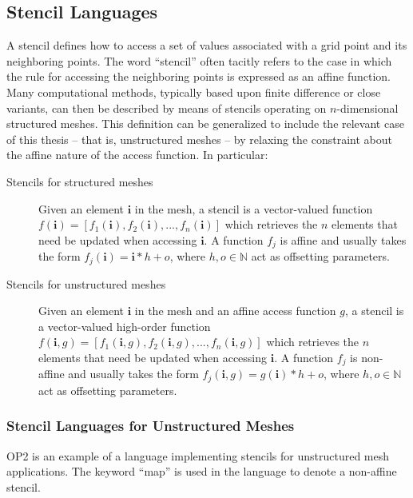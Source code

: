 \subsection{Stencil Languages}
A stencil defines how to access a set of values associated with a grid point and its neighboring points. The word ``stencil'' often tacitly refers to the case in which the rule for accessing the neighboring points is expressed as an affine function. Many computational methods, typically based upon finite difference or close variants, can then be described by means of stencils operating on $n$-dimensional structured meshes. This definition can be generalized to include the relevant case of this thesis -- that is, unstructured meshes -- by relaxing the constraint about the affine nature of the access function. In particular:

\begin{description}
\item[Stencils for structured meshes] Given an element $\boldsymbol{i}$ in the mesh, a stencil is a vector-valued function $f(\boldsymbol{i}) = [f_1(\boldsymbol{i}), f_2(\boldsymbol{i}), ..., f_n(\boldsymbol{i})]$ which retrieves the $n$ elements that need be updated when accessing $\boldsymbol{i}$. A function $f_j$ is affine and usually takes the form $f_j(\boldsymbol{i}) = \boldsymbol{i}*h + o$, where $h, o \in \mathbb{N}$ act as offsetting parameters.
\item[Stencils for unstructured meshes] Given an element $\boldsymbol{i}$ in the mesh and an affine access function $g$, a stencil is a vector-valued high-order function $f(\boldsymbol{i}, g) = [f_1(\boldsymbol{i}, g), f_2(\boldsymbol{i}, g), ..., f_n(\boldsymbol{i}, g)]$ which retrieves the $n$ elements that need be updated when accessing $\boldsymbol{i}$. A function $f_j$ is non-affine and usually takes the form $f_j(\boldsymbol{i}, g) = g(\boldsymbol{i})*h + o$, where $h, o \in \mathbb{N}$ act as offsetting parameters.
\end{description}

\subsubsection{Stencil Languages for Unstructured Meshes}
OP2 is an example of a language implementing stencils for unstructured mesh applications. The keyword ``map'' is used in the language to denote a non-affine stencil. 

